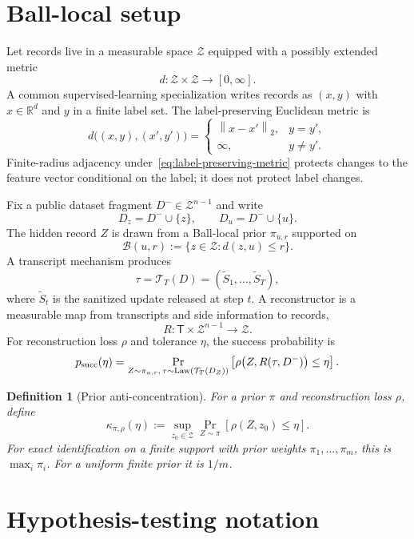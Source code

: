 \documentclass[conference,compsoc]{IEEEtran}
\newtheorem{definition}{Definition}
\DeclareMathOperator{\Law}{Law}
\newcommand{\R}{\mathbb{R}}
\newcommand{\Ball}{\mathcal{B}}
\newcommand{\cZ}{\mathcal{Z}}
\newcommand{\cT}{\mathcal{T}}
\newcommand{\norm}[1]{\left\lVert #1\right\rVert}
\begin{document}
\section{Ball-local setup}
\label{sec:setup}

Let records live in a measurable space $\cZ$ equipped with a possibly extended
metric
\[
d:\cZ\times\cZ\to[0,\infty].
\]
A common supervised-learning specialization writes records as $(x,y)$ with
$x\in\R^d$ and $y$ in a finite label set.  The label-preserving Euclidean metric
is
\begin{equation}
\label{eq:label-preserving-metric}
d\big((x,y),(x',y')\big)
=
\begin{cases}
\norm{x-x'}_2, & y=y',\\
\infty, & y\ne y'.
\end{cases}
\end{equation}
Finite-radius adjacency under~\eqref{eq:label-preserving-metric} protects
changes to the feature vector conditional on the label; it does not protect
label changes.

Fix a public dataset fragment $D^-\in\cZ^{n-1}$ and write
\[
D_z=D^-\cup\{z\},
\qquad
D_u=D^-\cup\{u\}.
\]
The hidden record $Z$ is drawn from a Ball-local prior $\pi_{u,r}$ supported on
\[
\Ball(u,r):=\{z\in\cZ:d(z,u)\le r\}.
\]
A transcript mechanism produces
\[
\tau=\cT_T(D)=(\tilde S_1,\ldots,\tilde S_T),
\]
where $\tilde S_t$ is the sanitized update released at step $t$.  A
reconstructor is a measurable map from transcripts and side information to
records,
\[
R:\mathsf T\times\cZ^{n-1}\to\cZ.
\]
For reconstruction loss $\rho$ and tolerance $\eta$, the success probability is
\begin{equation}
\label{eq:success-probability}
p_{\rm succ}(\eta)
=
\Pr_{Z\sim\pi_{u,r},\,\tau\sim\Law(\cT_T(D_Z))}
\left[\rho\bigl(Z,R(\tau,D^-)\bigr)\le\eta\right].
\end{equation}

\begin{definition}[Prior anti-concentration]
For a prior $\pi$ and reconstruction loss $\rho$, define
\[
\kappa_{\pi,\rho}(\eta)
:=
\sup_{z_0\in\cZ}
\Pr_{Z\sim\pi}\left[\rho(Z,z_0)\le\eta\right].
\]
For exact identification on a finite support with prior weights
$\pi_1,\ldots,\pi_m$, this is $\max_i\pi_i$.  For a uniform finite prior it is
$1/m$.
\end{definition}

\section{Hypothesis-testing notation}
\label{sec:hypothesis-testing}
\end{document}
